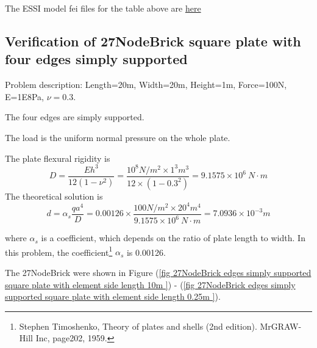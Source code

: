\documentclass[fleqn,11pt,letter]{article}
\begin{document}
The ESSI model fei files for the table above are \href{https://github.com/yuan-energy/ESSI_Verification/blob/master/27NodeBrick/square_plate_clamped/square_plate_clamped.tar.gz?raw=true}{here}



\newpage
\subsection{Verification of 27NodeBrick square plate with four edges simply supported}

Problem description: Length=20m, Width=20m, Height=1m, Force=100N, E=1E8Pa, $\nu=0.3$. 

The four edges are simply supported. 

The load is the uniform normal pressure on the whole plate. 

The plate flexural rigidity is 
\begin{equation}
  D=\frac{Eh^3}{12(1-\nu^2)}=\frac{10^8 N/m^2 \times 1^3 m^3 }{12 \times (1-0.3^2) }= 9.1575 \times 10^6 \ N\cdot m
\end{equation}
The theoretical solution is 
\begin{equation}
  d=\alpha_s \frac{q a^4}{D}=0.00126\times \frac{100 N/m^2 \times 20^4 m^4}{9.1575 \times 10^6 \ N\cdot m}=7.0936\times 10^{-3} m
\end{equation}

where $\alpha_s$ is a coefficient, which depends on the ratio of plate length to width. In this problem, the coefficient\footnote{Stephen Timoshenko, Theory of plates and shells (2nd edition). MrGRAW-Hill Inc, page202, 1959.} $\alpha_s$ is 0.00126.

The 27NodeBrick were shown in Figure (\ref{fig 27NodeBrick edges simply supported square plate with element side length 10m }) - (\ref{fig 27NodeBrick edges simply supported square plate with element side length 0.25m }). 
\end{document}

